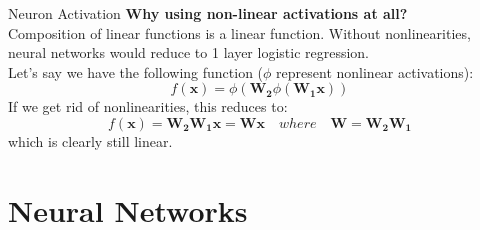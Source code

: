 \documentclass[aspectratio=169]{beamer}
\begin{document}

\begin{frame}{Neuron Activation}
\textbf{Why using non-linear activations at all?}\\
Composition of linear functions is a linear function. Without nonlinearities, neural networks would reduce to 1 layer logistic regression.\\
Let's say we have the following function ($\phi$ represent nonlinear activations):
\begin{equation*}
f(\bm{x}) = \phi(\mathbf{W_2}\phi(\mathbf{W_1x}))
\end{equation*}
If we get rid of nonlinearities, this reduces to:
\begin{equation*}
f(\bm{x}) = \mathbf{W_2}\mathbf{W_1x} = \bm{Wx} \quad where \quad \bm{W}=\bm{W_2W_1}
\end{equation*} 
which is clearly still linear.
\end{frame}


\section{Neural Networks}
\end{document}
